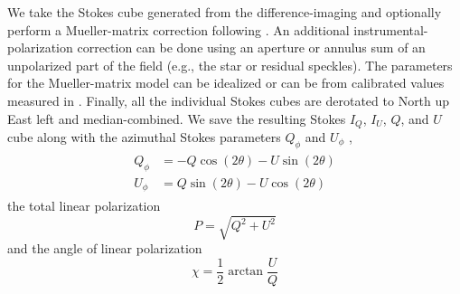 We take the Stokes cube generated from the difference-imaging and optionally perform a Mueller-matrix correction following \citet{holstein_polarimetric_2020}. An additional instrumental-polarization correction can be done using an aperture or annulus sum of an unpolarized part of the field (e.g., the star or residual speckles\citealt{boer_polarimetric_2020}). 
The parameters for the Mueller-matrix model can be idealized or can be from calibrated values measured in \citet{zhang_characterizing_2023}. Finally, all the individual Stokes cubes are derotated to North up East left and median-combined. We save the resulting Stokes $I_Q$, $I_U$, $Q$, and $U$ cube along with the azimuthal Stokes parameters $Q_\phi$ and $U_\phi$ \citep{monnier_multiple_2019,boer_polarimetric_2020}, 
\begin{align}
\begin{split}
    \label{eqn:az_stokes}
    Q_\phi &= -Q\cos{\left(2\theta\right)} - U\sin{\left(2\theta\right)} \\
    U_\phi &= Q\sin{\left(2\theta\right)} - U\cos{\left(2\theta\right)}
\end{split}
\end{align}
the total linear polarization
\begin{equation}
    P = \sqrt{Q^2 + U^2}
\end{equation}
and the angle of linear polarization
\begin{equation}
    \chi = \frac12\arctan{\frac{U}{Q}}
\end{equation}